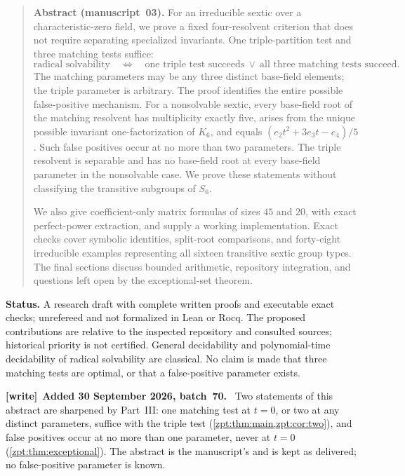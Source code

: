 \documentclass[11pt,letterpaper]{article}
\numberwithin{equation}{section}
\theoremstyle{definition}
\theoremstyle{remark}
\newenvironment{writenote}[1][]{\par\smallskip\begingroup\small
 \noindent\textbf{[write]}\if\relax\detokenize{#1}\relax\else~\textbf{#1.}\fi\ }%
 {\par\endgroup\smallskip}
\begin{document}
\begin{quote}\small
\textbf{Abstract (manuscript~03).}
For an irreducible sextic over a characteristic-zero field, we prove a fixed
four-resolvent criterion that does not require separating specialized
invariants. One triple-partition test and three matching tests suffice:
\[
 \text{radical solvability}\quad\Longleftrightarrow\quad
 \text{one triple test succeeds}\ \lor\ \text{all three matching tests succeed}.
\]
The matching parameters may be any three distinct base-field elements; the
triple parameter is arbitrary. The proof identifies the entire possible
false-positive mechanism. For a nonsolvable sextic, every base-field root of
the matching resolvent has multiplicity exactly five, arises from the unique
possible invariant one-factorization of $K_6$, and equals
$(e_2t^2+3e_3t-e_4)/5$. Such false positives occur at no more than two
parameters. The triple resolvent is separable and has no base-field root at
every base-field parameter in the nonsolvable case. We prove these statements
without classifying the transitive subgroups of $S_6$.

We also give coefficient-only matrix formulas of sizes $45$ and $20$, with
exact perfect-power extraction, and supply a working implementation. Exact
checks cover symbolic identities, split-root comparisons, and forty-eight
irreducible examples representing all sixteen transitive sextic group types.
The final sections discuss bounded arithmetic, repository integration, and
questions left open by the exceptional-set theorem.
\end{quote}

\begin{resultbox}
\textbf{Status.} A research draft with complete written proofs and executable
exact checks; unrefereed and not formalized in Lean or Rocq. The proposed
contributions are relative to the inspected repository and consulted sources;
historical priority is not certified. General decidability and polynomial-time
decidability of radical solvability are classical. No claim is made that three
matching tests are optimal, or that a false-positive parameter exists.
\end{resultbox}

\begin{writenote}[Added 30 September 2026, batch~70]
Two statements of this abstract are sharpened by Part~III: one matching
test at $t=0$, or two at any distinct parameters, suffice with the triple
test (\cref{zpt:thm:main,zpt:cor:two}), and false positives occur at no more
than one parameter, never at $t=0$ (\cref{zpt:thm:exceptional}). The
abstract is the manuscript's and is kept as delivered; no false-positive
parameter is known.
\end{writenote}
\end{document}
